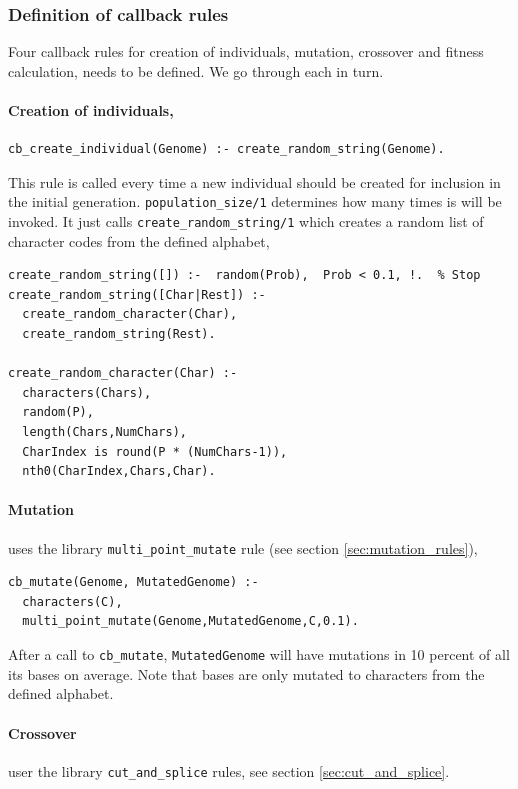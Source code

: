\documentclass{article}
\begin{document}
\subsubsection{Definition of callback rules}

Four callback rules for creation of individuals, mutation, crossover and fitness calculation,  needs to be defined. We go through each in turn.

\paragraph{Creation of individuals,}

\begin{verbatim}
cb_create_individual(Genome) :- create_random_string(Genome).
\end{verbatim}
This rule is called every time a new individual should be created for inclusion in the initial generation. \verb|population_size/1| determines how many times is will be invoked.
It just calls \verb|create_random_string/1| which creates a random list of character codes from the defined alphabet,
\begin{verbatim}
create_random_string([]) :-  random(Prob),  Prob < 0.1, !.  % Stop
create_random_string([Char|Rest]) :-
  create_random_character(Char),
  create_random_string(Rest).

create_random_character(Char) :-
  characters(Chars),
  random(P),
  length(Chars,NumChars),
  CharIndex is round(P * (NumChars-1)),
  nth0(CharIndex,Chars,Char).
\end{verbatim}

\paragraph{Mutation} uses the library \verb|multi_point_mutate| rule (see section \ref{sec:mutation_rules}), 
\begin{verbatim}
cb_mutate(Genome, MutatedGenome) :-
  characters(C),
  multi_point_mutate(Genome,MutatedGenome,C,0.1).
\end{verbatim}

After a call to \verb|cb_mutate|, \verb|MutatedGenome| will have mutations in 10 percent of all its bases on average. Note that bases are only 
mutated to characters from the defined alphabet.

\paragraph{Crossover} user the library \verb|cut_and_splice| rules, see section \ref{sec:cut_and_splice}.
\end{document}

